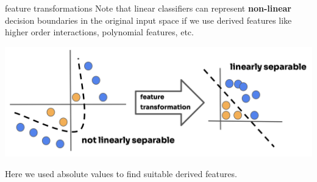 \documentclass[11pt,compress,t,notes=noshow, xcolor=table]{beamer}
\begin{document}
\begin{vbframe}{feature transformations}
Note that linear classifiers can represent \textbf{non-linear} decision boundaries in the original input space if we use derived features like higher order interactions, polynomial features, etc.

\begin{center}
\includegraphics{figure_man/linear_separability-2.png} 
\end{center}

\lz

Here we used absolute values to find suitable derived features.

\end{vbframe}

\endlecture
\end{document}
